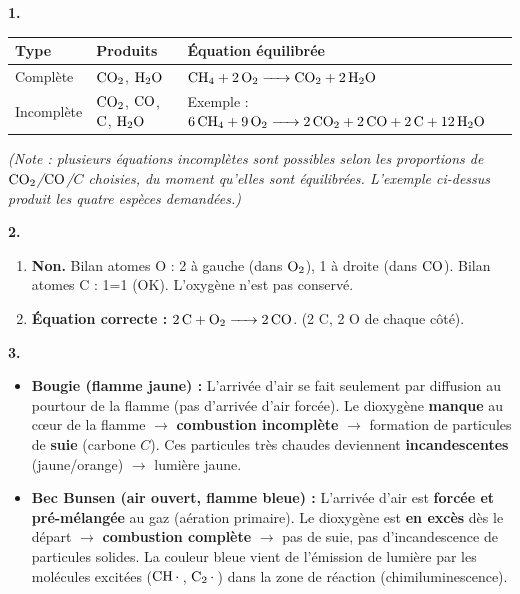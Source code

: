 \documentclass[11pt]{article}
\begin{document}
\begin{corrige}
\textbf{1.}
\begin{center}
\begin{tabularx}{\linewidth}{|>{\centering\arraybackslash}X|>{\centering\arraybackslash}X|>{\centering\arraybackslash}X|}
\hline
\textbf{Type} & \textbf{Produits} & \textbf{Équation équilibrée} \\ \hline
Complète & $\ce{CO2}$, $\ce{H2O}$ & $\ce{CH4 + 2 O2 -> CO2 + 2 H2O}$ \\ \hline
Incomplète & $\ce{CO2}$, $\ce{CO}$, $\ce{C}$, $\ce{H2O}$ & Exemple : $\ce{6 CH4 + 9 O2 -> 2 CO2 + 2 CO + 2 C + 12 H2O}$ \\ \hline
\end{tabularx}
\end{center}
\textit{(Note : plusieurs équations incomplètes sont possibles selon les proportions de $\ce{CO2}$/$\ce{CO}$/$C$ choisies, du moment qu'elles sont équilibrées. L'exemple ci-dessus produit les quatre espèces demandées.)}

\textbf{2.}
\begin{enumerate}
\item \textbf{Non.} Bilan atomes O : 2 à gauche (dans $\ce{O2}$), 1 à droite (dans $\ce{CO}$). Bilan atomes C : 1=1 (OK). L'oxygène n'est pas conservé.
\item \textbf{Équation correcte :} $\ce{2 C + O2 -> 2 CO}$. (2 C, 2 O de chaque côté).
\end{enumerate}

\textbf{3.} 
\begin{itemize}
\item \textbf{Bougie (flamme jaune) :} L'arrivée d'air se fait seulement par diffusion au pourtour de la flamme (pas d'arrivée d'air forcée). Le dioxygène \textbf{manque} au cœur de la flamme $\rightarrow$ \textbf{combustion incomplète} $\rightarrow$ formation de particules de \textbf{suie} (carbone $C$). Ces particules très chaudes deviennent \textbf{incandescentes} (jaune/orange) $\rightarrow$ lumière jaune.
\item \textbf{Bec Bunsen (air ouvert, flamme bleue) :} L'arrivée d'air est \textbf{forcée et pré-mélangée} au gaz (aération primaire). Le dioxygène est \textbf{en excès} dès le départ $\rightarrow$ \textbf{combustion complète} $\rightarrow$ pas de suie, pas d'incandescence de particules solides. La couleur bleue vient de l'émission de lumière par les molécules excitées ($\ce{CH*}$, $\ce{C2*}$) dans la zone de réaction (chimiluminescence).
\end{itemize}
\end{corrige}
\end{document}
